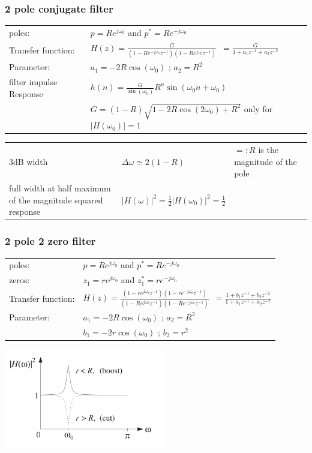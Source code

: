 \subsubsection{2 pole conjugate filter}

\begin{tabularx}{1\textwidth}{l X}
	poles: & $ p = R e^{j\omega_0}$ \qquad and \qquad $ p^* = R e^{-j\omega_0}$
	\\ 
	Transfer function: & $H(z)= \frac{G}{(1-R e^{-j\omega_0}z^{-1})(1-Re^{j\omega_0}z^{-1})}$\
	$=\frac{G}{1+a_1z^{-1}+a_2z^{-2}}$
	\\
	Parameter: & $a_1 = -2R\cos(\omega_0)$ \qquad; \qquad $a_2 = R^2$
	\\ 
	filter impulse Response & $h(n) = \frac{G}{\sin(\omega_0)}R^n \sin(\omega_0 n + \omega_0)$
	\\ 
	& $G = (1-R)\sqrt{1-2R\cos(2\omega_0)+ R^2}$ \quad only for $|H(\omega_0)| = 1$
\end{tabularx}
\begin{tabularx}{1\textwidth}{Xll}
	3dB width & $\Delta\omega \simeq 2(1-R)$ & $=:R$ is the magnitude of the pole \\
	full width at half maximum of the magnitude squared response & $|H(\omega)|^2=\frac{1}{2}|H(\omega_0)|^2=\frac{1}{2}$&
\end{tabularx}

\subsubsection{2 pole 2 zero filter}

\begin{tabular}[b]{l l}
	poles: & $ p = R e^{j\omega_0}$ \qquad and \qquad $ p^* = R e^{-j\omega_0}$
	\\ 
	zeros: & $ z_1 = r e^{j\omega_0}$ \qquad and \qquad $ z_1^* = r e^{-j\omega_0}$
	\\
	Transfer function: & $H(z)= \frac{(1-r e^{j\omega_0}z^{-1})(1-re^{-j\omega_0}z^{-1})}{(1-R e^{j\omega_0}z^{-1})(1-Re^{-j\omega_0}z^{-1})}$\
	$=\frac{1+b_1z^{-1}+b_2z^{-2}}{1+a_1z^{-1}+a_2z^{-2}}$
	\\ 
	Parameter: & $a_1 = -2R\cos(\omega_0)$ \qquad; \qquad $a_2 = R^2$
	\\ 
	& $b_1 = -2r\cos(\omega_0)$ \qquad; \qquad $b_2 = r^2$
\end{tabular}
\includegraphics[width=7cm]{./picture/pole_zero_filter}


